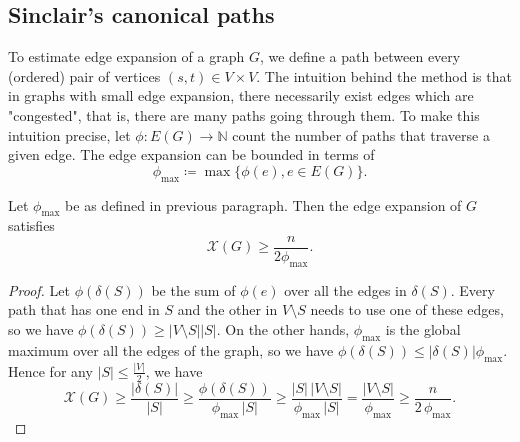 \subsection{Sinclair's canonical paths}

To estimate edge expansion of a graph $G$, we define a path between every (ordered) pair of vertices $(s,t) \in V \times V$.
The intuition behind the method is that in graphs with small edge expansion, there necessarily exist edges which are "congested", that is, there
are many paths going through them. To make this intuition precise, let $\phi: E(G) \rightarrow \mathbb{N}$ count the number of paths
that traverse a given edge. The edge expansion can be bounded 
in terms of
\begin{equation}
\phi_{\max} \coloneqq \max \{ \phi(e), e \in E(G) \}.
\end{equation}


\begin{lemma}
\label{Sinclair}
Let $\phi_{\max}$ be as defined in previous paragraph. Then the edge expansion of $G$ satisfies 
\begin{equation}
\mathcal{X}(G) \ge \frac{n}{2 \phi_{\max}}.
\end{equation}
\end{lemma}

\begin{proof}
Let $\phi(\delta(S))$ be the sum of $\phi(e)$ over all the edges in $\delta(S)$. Every path that has one end in $S$
and the other in $V\setminus S$ needs to use one of these edges, so we have $\phi(\delta(S)) \ge   |V\setminus S | |S |$.
On the other hands, $\phi_{\max}$ is the global maximum over all the edges of the graph, so we have $\phi(\delta(S)) \le  |\delta(S) |\phi_{\max}$.
Hence for any $|S| \le \frac{ |V |}{2}$, we have
\begin{equation}
\label{sepbound}
 \mathcal{X}(G) \ge \frac{|\delta(S)|}{|S|} 
                \ge \frac{\phi(\delta(S))}{\phi_{\max}\,|S|}
                \ge \frac{|S|\,|V{\setminus}S|}{\phi_{\max}\,|S|}
                 =  \frac{|V{\setminus}S|}{\phi_{\max}}
				\ge \frac{n}{2\,\phi_{\max}}.
\end{equation}
\end{proof} 
